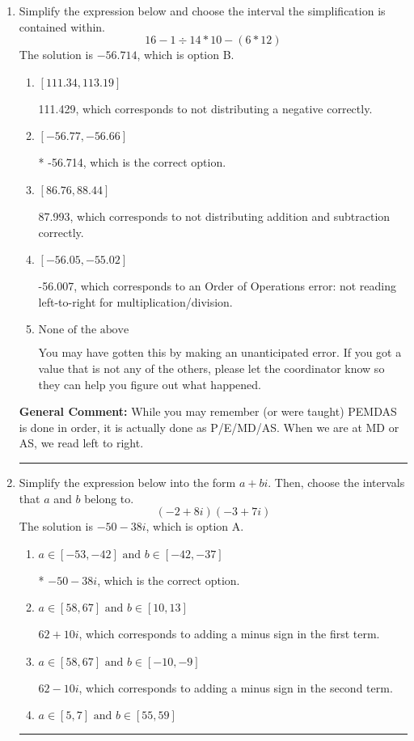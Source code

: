 \documentclass{extbook}[14pt]
\newcommand{\litem}[1]{\item #1

\rule{\textwidth}{0.4pt}}
\begin{document}
\begin{enumerate}\litem{
Simplify the expression below and choose the interval the simplification is contained within.
\[ 16 - 1 \div 14 * 10 - (6 * 12) \]The solution is \( -56.714 \), which is option B.\begin{enumerate}[label=\Alph*.]
\item \( [111.34, 113.19] \)

 111.429, which corresponds to not distributing a negative correctly.
\item \( [-56.77, -56.66] \)

* -56.714, which is the correct option.
\item \( [86.76, 88.44] \)

 87.993, which corresponds to not distributing addition and subtraction correctly.
\item \( [-56.05, -55.02] \)

 -56.007, which corresponds to an Order of Operations error: not reading left-to-right for multiplication/division.
\item \( \text{None of the above} \)

 You may have gotten this by making an unanticipated error. If you got a value that is not any of the others, please let the coordinator know so they can help you figure out what happened.
\end{enumerate}

\textbf{General Comment:} While you may remember (or were taught) PEMDAS is done in order, it is actually done as P/E/MD/AS. When we are at MD or AS, we read left to right.
}
\litem{
Simplify the expression below into the form $a+bi$. Then, choose the intervals that $a$ and $b$ belong to.
\[ (-2 + 8 i)(-3 + 7 i) \]The solution is \( -50 - 38 i \), which is option A.\begin{enumerate}[label=\Alph*.]
\item \( a \in [-53, -42] \text{ and } b \in [-42, -37] \)

* $-50 - 38 i$, which is the correct option.
\item \( a \in [58, 67] \text{ and } b \in [10, 13] \)

 $62 + 10 i$, which corresponds to adding a minus sign in the first term.
\item \( a \in [58, 67] \text{ and } b \in [-10, -9] \)

 $62 - 10 i$, which corresponds to adding a minus sign in the second term.
\item \( a \in [5, 7] \text{ and } b \in [55, 59] \)


\end{enumerate}}
\end{enumerate}
\end{document}
